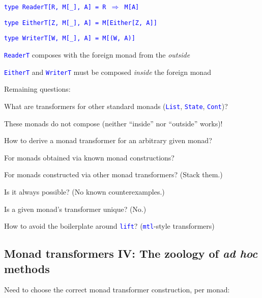 \texttt{\textcolor{blue}{\footnotesize{}type ReaderT{[}R, M{[}\_{]},
A{]} = R $\Rightarrow$ M{[}A{]}}}{\footnotesize\par}

\texttt{\textcolor{blue}{\footnotesize{}type EitherT{[}Z, M{[}\_{]},
A{]} = M{[}Either{[}Z, A{]}{]}}}{\footnotesize\par}

\texttt{\textcolor{blue}{\footnotesize{}type WriterT{[}W, M{[}\_{]},
A{]} = M{[}(W, A){]}}}{\footnotesize\par}

{\footnotesize{}\vspace{-0.2cm}}\texttt{\textcolor{blue}{\footnotesize{}ReaderT}}
composes with the foreign monad from the \emph{outside}

\texttt{\textcolor{blue}{\footnotesize{}EitherT}} and \texttt{\textcolor{blue}{\footnotesize{}WriterT}}
must be composed \emph{inside} the foreign monad

{\footnotesize{}\vspace{-0.1cm}}Remaining questions:

What are transformers for other standard monads (\texttt{\textcolor{blue}{\footnotesize{}List}},
\texttt{\textcolor{blue}{\footnotesize{}State}}, \texttt{\textcolor{blue}{\footnotesize{}Cont}})?

These monads do not compose (neither ``inside'' nor ``outside''
works)!

How to derive a monad transformer for an arbitrary given monad?

For monads obtained via known monad constructions?

For monads constructed via other monad transformers? (Stack them.)

Is it always possible? (No known counterexamples.)

Is a given monad's transformer unique? (No.)

How to avoid the boilerplate around \texttt{\textcolor{blue}{\footnotesize{}lift}}?
(\texttt{\textcolor{blue}{\footnotesize{}mtl}}-style transformers)


\subsection{Monad transformers IV: The zoology of \emph{ad hoc} methods}

{\footnotesize{}\vspace{-0.2cm}}Need to choose the correct monad
transformer construction, per monad:


